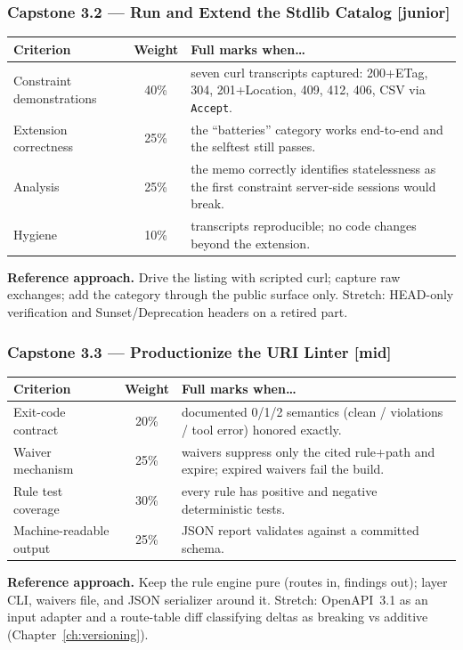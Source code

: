 \subsubsection*{Capstone 3.2 --- Run and Extend the Stdlib Catalog [junior]}
\begin{center}\small
\begin{tabularx}{\textwidth}{l c X}
\toprule
\textbf{Criterion} & \textbf{Weight} & \textbf{Full marks when\ldots} \\
\midrule
Constraint demonstrations & 40\% & seven curl transcripts captured: 200+ETag, 304, 201+Location, 409, 412, 406, CSV via \texttt{Accept}. \\
Extension correctness & 25\% & the ``batteries'' category works end-to-end and the selftest still passes. \\
Analysis & 25\% & the memo correctly identifies statelessness as the first constraint server-side sessions would break. \\
Hygiene & 10\% & transcripts reproducible; no code changes beyond the extension. \\
\bottomrule
\end{tabularx}
\end{center}
\textbf{Reference approach.} Drive the listing with scripted curl; capture
raw exchanges; add the category through the public surface only. Stretch:
HEAD-only verification and Sunset/Deprecation headers on a retired part.

\subsubsection*{Capstone 3.3 --- Productionize the URI Linter [mid]}
\begin{center}\small
\begin{tabularx}{\textwidth}{l c X}
\toprule
\textbf{Criterion} & \textbf{Weight} & \textbf{Full marks when\ldots} \\
\midrule
Exit-code contract & 20\% & documented 0/1/2 semantics (clean / violations / tool error) honored exactly. \\
Waiver mechanism & 25\% & waivers suppress only the cited rule+path and expire; expired waivers fail the build. \\
Rule test coverage & 30\% & every rule has positive and negative deterministic tests. \\
Machine-readable output & 25\% & JSON report validates against a committed schema. \\
\bottomrule
\end{tabularx}
\end{center}
\textbf{Reference approach.} Keep the rule engine pure (routes in, findings
out); layer CLI, waivers file, and JSON serializer around it. Stretch:
OpenAPI~3.1 as an input adapter and a route-table diff classifying deltas
as breaking vs additive (Chapter~\ref{ch:versioning}).

